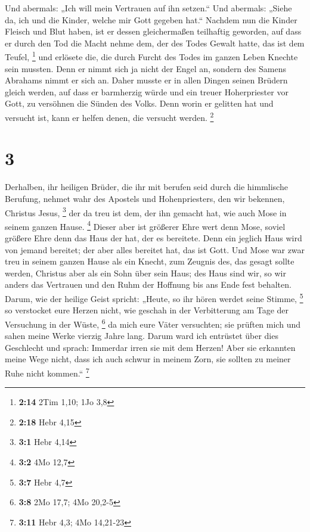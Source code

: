  Und abermals: „Ich will mein Vertrauen auf ihn setzen.``
Und abermals: „Siehe da, ich und die Kinder, welche mir Gott gegeben
hat.``  Nachdem nun die Kinder Fleisch und Blut haben, ist
er dessen gleichermaßen teilhaftig geworden, auf dass er durch den Tod
die Macht nehme dem, der des Todes Gewalt hatte, das ist dem Teufel,
\footnote{\textbf{2:14} 2Tim 1,10; 1Jo 3,8}  und erlösete
die, die durch Furcht des Todes im ganzen Leben Knechte sein mussten.
 Denn er nimmt sich ja nicht der Engel an, sondern des
Samens Abrahams nimmt er sich an.  Daher musste er in allen
Dingen seinen Brüdern gleich werden, auf dass er barmherzig würde und
ein treuer Hoherpriester vor Gott, zu versöhnen die Sünden des Volks.
 Denn worin er gelitten hat und versucht ist, kann er
helfen denen, die versucht werden. \footnote{\textbf{2:18} Hebr 4,15}

\hypertarget{section-1}{%
\section{3}\label{section-1}}

 Derhalben, ihr heiligen Brüder, die ihr mit berufen seid
durch die himmlische Berufung, nehmet wahr des Apostels und
Hohenpriesters, den wir bekennen, Christus Jesus, \footnote{\textbf{3:1}
  Hebr 4,14}  der da treu ist dem, der ihn gemacht hat, wie
auch Mose in seinem ganzen Hause. \footnote{\textbf{3:2} 4Mo 12,7}
 Dieser aber ist größerer Ehre wert denn Mose, soviel
größere Ehre denn das Haus der hat, der es bereitete.  Denn
ein jeglich Haus wird von jemand bereitet; der aber alles bereitet hat,
das ist Gott.  Und Mose war zwar treu in seinem ganzen Hause
als ein Knecht, zum Zeugnis des, das gesagt sollte werden, 
Christus aber als ein Sohn über sein Haus; des Haus sind wir, so wir
anders das Vertrauen und den Ruhm der Hoffnung bis ans Ende fest
behalten.  Darum, wie der heilige Geist spricht: „Heute, so
ihr hören werdet seine Stimme, \footnote{\textbf{3:7} Hebr 4,7}
 so verstocket eure Herzen nicht, wie geschah in der
Verbitterung am Tage der Versuchung in der Wüste, \footnote{\textbf{3:8}
  2Mo 17,7; 4Mo 20,2-5}  da mich eure Väter versuchten; sie
prüften mich und sahen meine Werke vierzig Jahre lang. 
Darum ward ich entrüstet über dies Geschlecht und sprach: Immerdar irren
sie mit dem Herzen! Aber sie erkannten meine Wege nicht, 
dass ich auch schwur in meinem Zorn, sie sollten zu meiner Ruhe nicht
kommen.`` \footnote{\textbf{3:11} Hebr 4,3; 4Mo 14,21-23}

